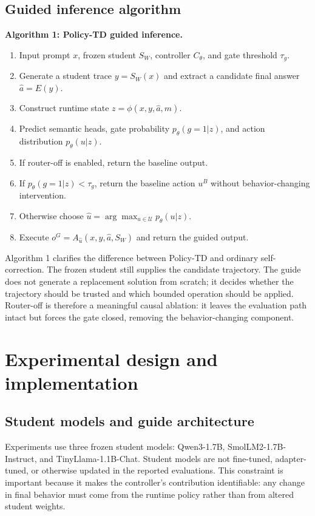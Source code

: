 \documentclass[11pt]{article}
\newcommand{\policytd}{Policy-TD}
\begin{document}
\subsection{Guided inference algorithm}
\noindent\textbf{Algorithm 1: Policy-TD guided inference.}
\begin{enumerate}
    \item Input prompt \(x\), frozen student \(S_W\), controller \(C_\theta\), and gate threshold \(\tau_g\).
    \item Generate a student trace \(y=S_W(x)\) and extract a candidate final answer \(\hat{a}=E(y)\).
    \item Construct runtime state \(z=\phi(x,y,\hat{a},m)\).
    \item Predict semantic heads, gate probability \(p_\theta(g=1|z)\), and action distribution \(p_\theta(u|z)\).
    \item If router-off is enabled, return the baseline output.
    \item If \(p_\theta(g=1|z)<\tau_g\), return the baseline action \(u^B\) without behavior-changing intervention.
    \item Otherwise choose \(\hat{u}=\arg\max_{u\in\mathcal{U}}p_\theta(u|z)\).
    \item Execute \(o^G=A_{\hat{u}}(x,y,\hat{a},S_W)\) and return the guided output.
\end{enumerate}

Algorithm 1 clarifies the difference between \policytd{} and ordinary self-correction. The frozen student still supplies the candidate trajectory. The guide does not generate a replacement solution from scratch; it decides whether the trajectory should be trusted and which bounded operation should be applied. Router-off is therefore a meaningful causal ablation: it leaves the evaluation path intact but forces the gate closed, removing the behavior-changing component.

\section{Experimental design and implementation}
\subsection{Student models and guide architecture}
Experiments use three frozen student models: Qwen3-1.7B, SmolLM2-1.7B-Instruct, and TinyLlama-1.1B-Chat. Student models are not fine-tuned, adapter-tuned, or otherwise updated in the reported evaluations. This constraint is important because it makes the controller's contribution identifiable: any change in final behavior must come from the runtime policy rather than from altered student weights.
\end{document}
